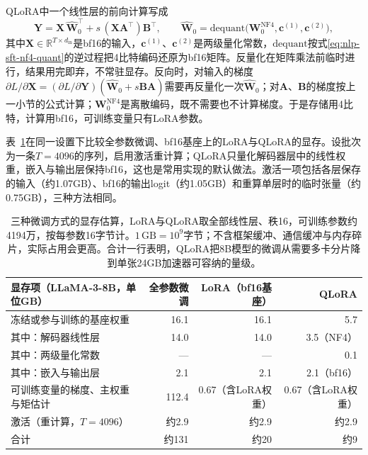 QLoRA中一个线性层的前向计算写成
\begin{equation}
 \bm Y=\bm X\,\widehat{\bm W}_0^{\top}+s\,(\bm X\bm A^{\top})\bm B^{\top},
 \qquad
 \widehat{\bm W}_0=\mathrm{dequant}\bigl(\bm W_0^{\mathrm{NF4}},\bm c^{(1)},\bm c^{(2)}\bigr),
 \label{eq:nlp-sft-qlora-forward}
\end{equation}
其中$\bm X\in\mathbb R^{T\times d_{\mathrm{in}}}$是bf16的输入，$\bm c^{(1)}$、$\bm c^{(2)}$是两级量化常数，$\mathrm{dequant}$按式\eqref{eq:nlp-sft-nf4-quant}的逆过程把4比特编码还原为bf16矩阵。反量化在矩阵乘法前临时进行，结果用完即弃，不常驻显存。反向时，对输入的梯度$\partial L/\partial\bm X=(\partial L/\partial\bm Y)(\widehat{\bm W}_0+s\bm B\bm A)$需要再反量化一次$\widehat{\bm W}_0$；对$\bm A$、$\bm B$的梯度按上一小节的公式计算；$\bm W_0^{\mathrm{NF4}}$是离散编码，既不需要也不计算梯度。于是存储用4比特，计算用bf16，可训练变量只有LoRA参数。

表~\ref{tab:nlp-sft-memory-compare}在同一设置下比较全参数微调、bf16基座上的LoRA与QLoRA的显存。设批次为一条$T=4096$的序列，启用激活重计算；QLoRA只量化解码器层中的线性权重，嵌入与输出层保持bf16，这也是常用实现的默认做法。激活一项包括各层保存的输入（约1.07GB）、bf16的输出logit（约1.05GB）和重算单层时的临时张量（约0.75GB），三种方法相同。

\begin{table}[htbp]
  \small
  \begin{tabularx}{\linewidth}{@{}Xrrr@{}}
    \toprule
    显存项（LLaMA-3-8B，单位GB） & 全参数微调 & LoRA（bf16基座） & QLoRA\\
    \midrule
    冻结或参与训练的基座权重 & 16.1 & 16.1 & 5.7\\
    \quad 其中：解码器线性层 & 14.0 & 14.0 & 3.5（NF4）\\
    \quad 其中：两级量化常数 & --- & --- & 0.1\\
    \quad 其中：嵌入与输出层 & 2.1 & 2.1 & 2.1（bf16）\\
    可训练变量的梯度、主权重与矩估计 & 112.4 & 0.67（含LoRA权重） & 0.67（含LoRA权重）\\
    激活（重计算，$T=4096$） & 约2.9 & 约2.9 & 约2.9\\
    \midrule
    合计 & 约131 & 约20 & 约9\\
    \bottomrule
  \end{tabularx}
  \caption{三种微调方式的显存估算，LoRA与QLoRA取全部线性层、秩16，可训练参数约4194万，按每参数16字节计。$1\,\mathrm{GB}=10^9$字节；不含框架缓冲、通信缓冲与内存碎片，实际占用会更高。合计一行表明，QLoRA把8B模型的微调从需要多卡分片降到单张24GB加速器可容纳的量级。}
  \label{tab:nlp-sft-memory-compare}
\end{table}

